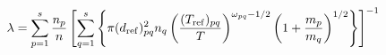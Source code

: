 \documentclass[12pt]{article}
\begin{document}
$$ 
  \lambda = \sum_{p=1}^{s} \frac{n_{p}}{n} \left [ \sum_{q=1}^{s}  \left \{ \pi (d_{\rm ref})^2_{pq} n_{q} \left (\frac{(T_{\rm ref})_{pq}}{T} \right )^{\omega_{pq} - 1/2} \left (1+\frac{m_{p}}{m_{q}} \right )^{1/2} \right \} \right ]^{-1}
$$
\end{document}
